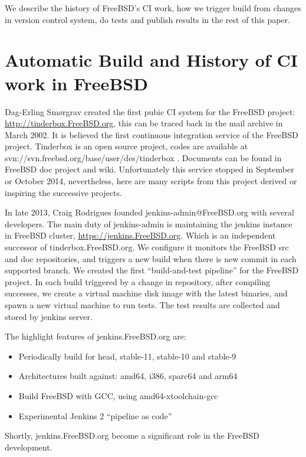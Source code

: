 \documentclass[a4paper,twocolumn,10pt]{article}
\begin{document}
We describe the history of FreeBSD's CI work, how we trigger build from changes
in version control system, do tests and publish results in the rest of this
paper.

\section{Automatic Build and History of CI work in FreeBSD}

Dag-Erling Smørgrav created the first pubic CI system for the FreeBSD project:
\url{http://tinderbox.FreeBSD.org}, this can be traced back in the mail archive in
March 2002. It is believed the first continuous integration service of the
FreeBSD project. Tinderbox is an open source project, codes are available at
svn://svn.freebsd.org/base/user/des/tinderbox .  Documents can be found in
FreeBSD doc project and wiki. Unfortunately this service stopped in September
or October 2014, nevertheless, here are many scripts from this project derived
or inspiring the successive projects.

In late 2013, Craig Rodrigues founded jenkins-admin@FreeBSD.org with several
developers. The main duty of jenkins-admin is maintaining the jenkins
instance in FreeBSD cluster, \url{https://jenkins.FreeBSD.org}. Which is an
independent successor of tinderbox.FreeBSD.org. We configure it monitors the
FreeBSD src and doc repositories, and triggers a new build when there is new
commit in each supported branch. We created the first ``build-and-test pipeline''
for the FreeBSD project. In each build triggered by a change in repository,
after compiling successes, we create a virtual machine disk image with the
latest binaries, and spawn a new virtual machine to run tests. The test results
are collected and stored by jenkins server.

The highlight features of jenkins.FreeBSD.org are:

\begin{itemize}
\item Periodically build for head, stable-11, stable-10 and stable-9
\item Architectures built against: amd64, i386, sparc64 and arm64
\item Build FreeBSD with GCC, using amd64-xtoolchain-gcc
\item Experimental Jenkins 2 ``pipeline as code''
\end{itemize}

Shortly, jenkins.FreeBSD.org become a significant role in the FreeBSD
development.
\end{document}
